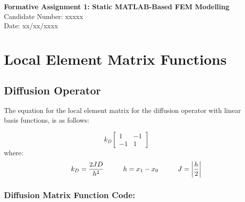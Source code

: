 \documentclass[11pt, a4paper]{article}
\begin{document}
	

	



\begin{titlepage}
	\vspace*{\fill}
	\centering
	{\Huge \textbf{Formative Assignment 1: Static MATLAB-Based FEM Modelling} \\}
	{\vspace{2cm}}
	{\large Candidate Number: xxxxx \\}
	{Date: xx/xx/xxxx}

	\vspace{5cm}
	\vspace*{\fill}
		
\end{titlepage}

\normalsize
\tableofcontents

\newpage

\section{Local Element Matrix Functions}
\subsection{Diffusion Operator}

The equation for the local element matrix for the diffusion operator with linear basis functions, is as follows:



\begin{equation}
	k_D
	\begin{bmatrix}
		1 & -1\\
		-1 & 1
	\end{bmatrix}
\end{equation}
	where:
\begin{equation}
	\hspace*{1cm}
	k_D = \frac{2JD}{h^2}
	\hspace{1cm}
	h = x_1-x_0
	\hspace*{1cm}
	J = \left|\frac{h}{2}\right| 	
\end{equation}


\subsubsection{Diffusion Matrix Function Code:}




\newpage
\end{document}
